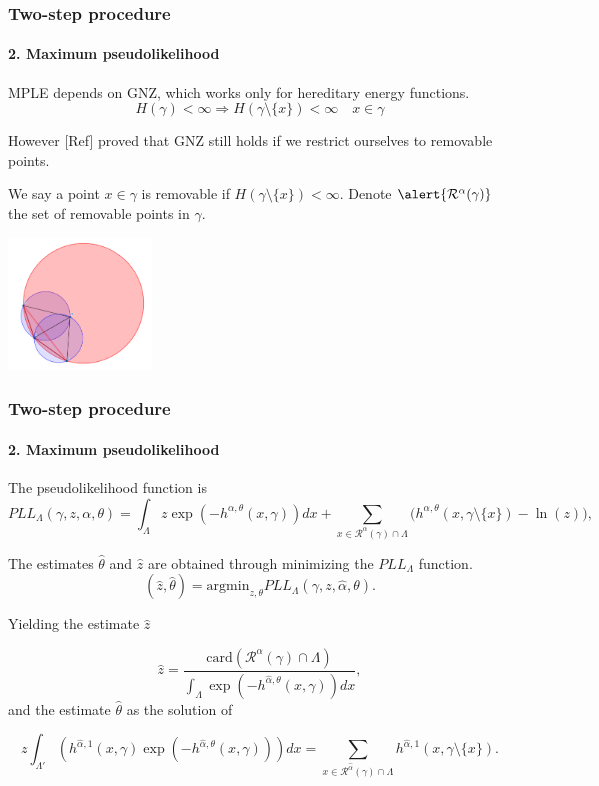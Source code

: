 \documentclass[c, 10pt]{beamer}
\begin{document}
\begin{frame}\frametitle{Two-step procedure}\framesubtitle{2. Maximum pseudolikelihood}
MPLE depends on GNZ, which works only for \alert{hereditary} energy functions.
$$H(\gamma) < \infty \Rightarrow H(\gamma \setminus \{x\}) < \infty \quad x \in \gamma$$

However [Ref] proved that GNZ still holds if we restrict ourselves to \alert{removable points}.\newline

We say a point $x\in \gamma$ is removable if $H(\gamma \setminus \{x\}) < \infty$. Denote $\alert {\mathcal R^\alpha(\gamma)}$ the set of removable points in $\gamma$. 

\begin{center}
\includegraphics[height = 3.5cm]{./FigureLayout/hereditarity.png}
\end{center}

\end{frame}

\begin{frame}\frametitle{Two-step procedure}\framesubtitle{2. Maximum pseudolikelihood}
\begin{small}
The pseudolikelihood function is
$$ PLL_{\Lambda }(\gamma,z,\alpha, \theta) = \int_{\Lambda } z \exp (-h^{\alpha,\theta}(x,\gamma)) dx + \sum_{x\in\mathcal R^\alpha(\gamma)\cap \Lambda } \big(h^{\alpha,\theta}(x,\gamma\setminus\{x\}) - \ln(z)\big),
$$


The estimates $\hat\theta$ and $\hat z$ are obtained through minimizing the $PLL_{\Lambda }$ function. 
$$(\hat z, \hat\theta) = \text{argmin}_{z,\theta} PLL_{\Lambda } (\gamma, z, \hat\alpha,\theta).$$

Yielding the estimate $\hat z$ 

$$\hat z = \frac{\mbox{card}(\mathcal R^\alpha(\gamma)\cap \Lambda)}{\int_{\Lambda} \exp{\left( -h^{\hat\alpha,\theta}(x,\gamma)\right)} dx},$$
and the estimate $\hat\theta$ as the solution of

$$z \int_{\Lambda'} (h^{\hat\alpha,1}(x,\gamma)\exp{\left(-h^{\hat\alpha,\theta}(x,\gamma)\right)}) dx = \sum_{x \in \mathcal R^{\hat\alpha}(\gamma)\cap \Lambda} h^{\hat\alpha,1}(x,\gamma\setminus\{x\}).$$

\end{small}
\end{frame}
\end{document}
